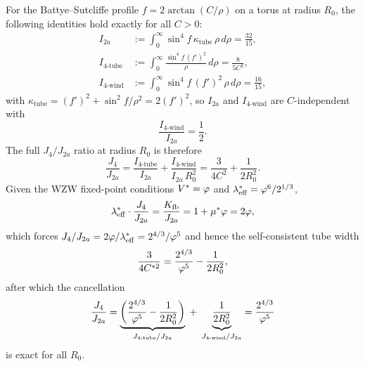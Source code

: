 \begin{theorem}
\label{P3:thm:lsc_1d_complete}
For the Battye--Sutcliffe profile $f = 2\arctan(C/\rho)$ on a torus at
radius $R_0$, the following identities hold exactly for all $C>0$:
\begin{align}
  I_{2a} &:= \int_0^\infty \sin^4\!f\,\kappa_{\mathrm{tube}}\,\rho\,d\rho = \frac{32}{15}, \label{P3:eq:I2a_exact}\\
  I_{4\text{-tube}} &:= \int_0^\infty \frac{\sin^4\!f\,(f')^2}{\rho}\,d\rho = \frac{8}{5C^2}, \label{P3:eq:I4tube_exact}\\
  I_{4\text{-wind}} &:= \int_0^\infty \sin^4\!f\,(f')^2\,\rho\,d\rho = \frac{16}{15}, \label{P3:eq:I4wind_exact}
\end{align}
with $\kappa_{\mathrm{tube}}=(f')^2+\sin^2\!f/\rho^2=2(f')^2$, so
$I_{2a}$ and $I_{4\text{-wind}}$ are $C$-independent with
\begin{equation}
  \frac{I_{4\text{-wind}}}{I_{2a}} = \frac{1}{2}.
  \label{P3:eq:wind_ratio}
\end{equation}
The full $J_4/J_{2a}$ ratio at radius $R_0$ is therefore
\begin{equation}
  \frac{J_4}{J_{2a}} = \frac{I_{4\text{-tube}}}{I_{2a}} + \frac{I_{4\text{-wind}}}{I_{2a}\,R_0^2}
  = \frac{3}{4C^2} + \frac{1}{2R_0^2}.
  \label{P3:eq:J4J2a_full}
\end{equation}
Given the WZW fixed-point conditions $V^*=\varphi$ and $\lambda_{\mathrm{eff}}^*=\varphi^6/2^{1/3}$,
\begin{equation}
  \lambda_{\mathrm{eff}}^*\cdot\frac{J_4}{J_{2a}} = \frac{K_{\mathrm{fb}}}{J_{2a}} = 1+\mu^*\varphi = 2\varphi,
  \label{P3:eq:master_relation}
\end{equation}
which forces $J_4/J_{2a}=2\varphi/\lambda_{\mathrm{eff}}^*=2^{4/3}/\varphi^5$ and hence the
self-consistent tube width
\begin{equation}
  \frac{3}{4C^{*2}} = \frac{2^{4/3}}{\varphi^5} - \frac{1}{2R_0^2},
  \label{P3:eq:Cstar_R0}
\end{equation}
after which the cancellation
\begin{equation}
  \frac{J_4}{J_{2a}}
  = \underbrace{\left(\frac{2^{4/3}}{\varphi^5}-\frac{1}{2R_0^2}\right)}_{J_{4\text{-tube}}/J_{2a}}
  \;+\; \underbrace{\frac{1}{2R_0^2}}_{J_{4\text{-wind}}/J_{2a}}
  = \frac{2^{4/3}}{\varphi^5}
  \label{P3:eq:cancellation}
\end{equation}
is exact for all $R_0$.
\end{theorem}

